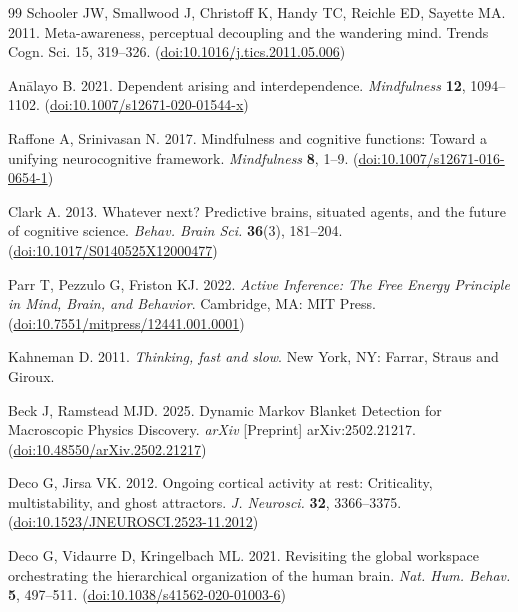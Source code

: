 \documentclass[openacc]{rsproca_new}%
\begin{document}
\begin{thebibliography}{99}
Schooler JW, Smallwood J, Christoff K, Handy TC, Reichle ED, Sayette MA. 2011. Meta-awareness, perceptual decoupling and the wandering mind. Trends Cogn. Sci. 15, 319--326. (\href{https://doi.org/10.1016/j.tics.2011.05.006}{doi:10.1016/j.tics.2011.05.006})

An\=alayo B. 2021. Dependent arising and interdependence. \textit{Mindfulness} \textbf{12}, 1094--1102. (\href{https://doi.org/10.1007/s12671-020-01544-x}{doi:10.1007/s12671-020-01544-x})

Raffone A, Srinivasan N. 2017. Mindfulness and cognitive functions: Toward a unifying neurocognitive framework. \textit{Mindfulness} \textbf{8}, 1--9. (\href{https://doi.org/10.1007/s12671-016-0654-1}{doi:10.1007/s12671-016-0654-1})

Clark A. 2013. Whatever next? Predictive brains, situated agents, and the future of cognitive science. \textit{Behav. Brain Sci.} \textbf{36}(3), 181--204. (\href{https://doi.org/10.1017/S0140525X12000477}{doi:10.1017/S0140525X12000477})

Parr T, Pezzulo G, Friston KJ. 2022. \textit{Active Inference: The Free Energy Principle in Mind, Brain, and Behavior}. Cambridge, MA: MIT Press. (\href{https://doi.org/10.7551/mitpress/12441.001.0001}{doi:10.7551/mitpress/12441.001.0001})

Kahneman D. 2011. \textit{Thinking, fast and slow}. New York, NY: Farrar, Straus and Giroux.

Beck J, Ramstead MJD. 2025. Dynamic Markov Blanket Detection for Macroscopic Physics Discovery. \textit{arXiv} [Preprint] arXiv:2502.21217. (\href{https://doi.org/10.48550/arXiv.2502.21217}{doi:10.48550/arXiv.2502.21217})

Deco G, Jirsa VK. 2012. Ongoing cortical activity at rest: Criticality, multistability, and ghost attractors. \textit{J. Neurosci.} \textbf{32}, 3366--3375. (\href{https://doi.org/10.1523/JNEUROSCI.2523-11.2012}{doi:10.1523/JNEUROSCI.2523-11.2012})

Deco G, Vidaurre D, Kringelbach ML. 2021. Revisiting the global workspace orchestrating the hierarchical organization of the human brain. \textit{Nat. Hum. Behav.} \textbf{5}, 497--511. (\href{https://doi.org/10.1038/s41562-020-01003-6}{doi:10.1038/s41562-020-01003-6})
\end{thebibliography}
\end{document}
